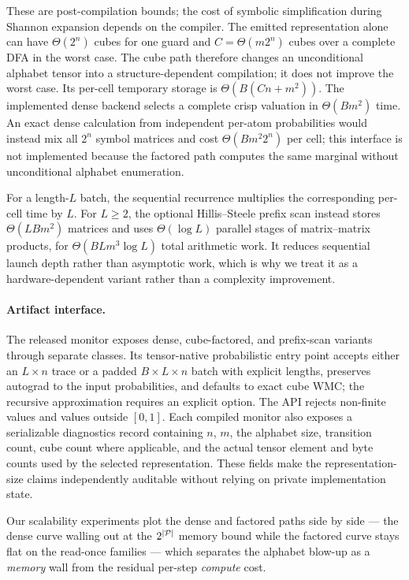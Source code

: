 These are post-compilation bounds; the cost of symbolic simplification during Shannon expansion depends on the compiler. The emitted representation alone can have $\Theta(2^n)$ cubes for one guard and $C=\Theta(m2^n)$ cubes over a complete DFA in the worst case. The cube path therefore changes an unconditional alphabet tensor into a structure-dependent compilation; it does not improve the worst case. Its per-cell temporary storage is $\Theta(B(Cn+m^2))$. The implemented dense backend selects a complete crisp valuation in $\Theta(Bm^2)$ time. An exact dense calculation from independent per-atom probabilities would instead mix all $2^n$ symbol matrices and cost $\Theta(Bm^2 2^n)$ per cell; this interface is not implemented because the factored path computes the same marginal without unconditional alphabet enumeration.

For a length-$L$ batch, the sequential recurrence multiplies the corresponding per-cell time by $L$. For $L\geq 2$, the optional Hillis--Steele prefix scan instead stores $\Theta(LBm^2)$ matrices and uses $\Theta(\log L)$ parallel stages of matrix--matrix products, for $\Theta(BLm^3\log L)$ total arithmetic work. It reduces sequential launch depth rather than asymptotic work, which is why we treat it as a hardware-dependent variant rather than a complexity improvement.

\paragraph{Artifact interface.}
The released monitor exposes dense, cube-factored, and prefix-scan variants through separate classes. Its tensor-native probabilistic entry point accepts either an $L\times n$ trace or a padded $B\times L\times n$ batch with explicit lengths, preserves autograd to the input probabilities, and defaults to exact cube WMC; the recursive approximation requires an explicit option. The API rejects non-finite values and values outside $[0,1]$. Each compiled monitor also exposes a serializable diagnostics record containing $n$, $m$, the alphabet size, transition count, cube count where applicable, and the actual tensor element and byte counts used by the selected representation. These fields make the representation-size claims independently auditable without relying on private implementation state.

Our scalability experiments plot the dense and factored paths side by side --- the dense curve walling out at the $2^{|{\mathcal{P}}|}$ memory bound while the factored curve stays flat on the read-once families --- which separates the alphabet blow-up as a \emph{memory} wall from the residual per-step \emph{compute} cost.
